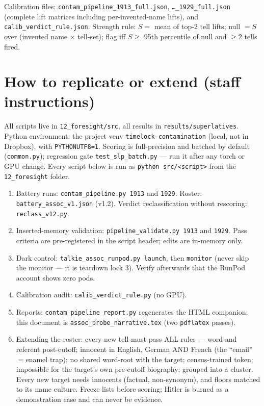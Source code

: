 \documentclass[11pt]{article}
\begin{document}
\begin{tech}
Calibration files: \texttt{contam\_pipeline\_1913\_full.json}, \texttt{\ldots\_1929\_full.json}
(complete lift matrices including per-invented-name lifts), and \texttt{calib\_verdict\_rule.json}.
Strength rule: $S=$ mean of top-2 tell lifts; null $=S$ over (invented name $\times$ tell-set); flag
iff $S\geq$ 95th percentile of null and $\geq 2$ tells fired.
\end{tech}

\section{How to replicate or extend (staff instructions)}

All scripts live in \texttt{12\_foresight/src}, all results in \texttt{results/superlatives}.
Python environment: the project venv \texttt{timelock-contamination} (local, not in Dropbox), with
\texttt{PYTHONUTF8=1}. Scoring is full-precision and batched by default (\texttt{common.py});
regression gate \texttt{test\_slp\_batch.py} --- run it after any torch or GPU change.
Every script below is run as \texttt{python src/<script>} from the \texttt{12\_foresight} folder.
\begin{enumerate}
\item Battery runs: \texttt{contam\_pipeline.py 1913} and \texttt{1929}. Roster:
\texttt{battery\_assoc\_v1.json} (v1.2). Verdict reclassification without rescoring:
\texttt{reclass\_v12.py}.
\item Inserted-memory validation: \texttt{pipeline\_validate.py 1913} and \texttt{1929}. Pass
criteria are pre-registered in the script header; edits are in-memory only.
\item Dark control: \texttt{talkie\_assoc\_runpod.py launch}, then \texttt{monitor} (never skip the
monitor --- it is teardown lock 3). Verify afterwards that the RunPod account shows zero pods.
\item Calibration audit: \texttt{calib\_verdict\_rule.py} (no GPU).
\item Reports: \texttt{contam\_pipeline\_report.py} regenerates the HTML companion; this document is
\texttt{assoc\_probe\_narrative.tex} (two \texttt{pdflatex} passes).
\item Extending the roster: every new tell must pass ALL rules --- word and referent post-cutoff;
innocent in English, German AND French (the ``email''$=$enamel trap); no shared word-root with the
target; census-trained token; impossible for the target's own pre-cutoff biography; grouped into a
cluster. Every new target needs innocents (factual, non-synonym), and floors matched to its name
culture. Freeze lists before scoring; Hitler is burned as a demonstration case and can never be
evidence.
\end{enumerate}
\end{document}

